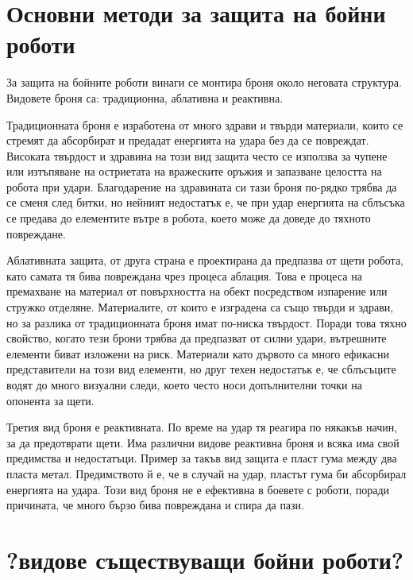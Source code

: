 \section{Основни методи за защита на бойни роботи}

За защита на бойните роботи винаги се монтира броня около неговата структура. Видовете броня са: традиционна, аблативна и реактивна.

Традиционната броня е изработена от много здрави и твърди материали, които се стремят да абсорбират и предадат енергията на удара без да се повреждат. Високата твърдост и здравина на този вид защита често се използва за чупене или изтъпяване на остриетата на вражеските оръжия и запазване целостта на робота при удари. Благодарение на здравината си тази броня по-рядко трябва да се сменя след битки, но нейният недостатък е, че при удар енергията на сблъсъка се предава до елементите вътре в робота, което може да доведе до тяхното повреждане.

Аблативната защита, от друга страна е проектирана да предпазва от щети робота, като самата тя бива повреждана чрез процеса аблация. Това е процеса на премахване на материал от повърхността на обект посредством изпарение или стружко отделяне. Материалите, от които е изградена са също твърди и здрави, но за разлика от традиционната броня имат по-ниска твърдост. Поради това тяхно свойство, когато тези брони трябва да предпазват от силни удари, вътрешните елементи биват изложени на риск. Материали като дървото са много ефикасни представители на този вид елементи, но друг техен недостатък е, че сблъсъците водят до много визуални следи, което често носи допълнителни точки на опонента за щети.

Третия вид броня е реактивната. По време на удар тя реагира по някакъв начин, за да предотврати щети. Има различни видове реактивна броня и всяка има свой предимства и недостатъци. Пример за такъв вид защита е пласт гума между два пласта метал. Предимството й е, че в случай на удар, пластът гума би абсорбирал енергията на удара. Този вид броня не е ефективна в боевете с роботи, поради причината, че много бързо бива повреждана и спира да пази.


\section{?видове съществуващи бойни роботи?}

